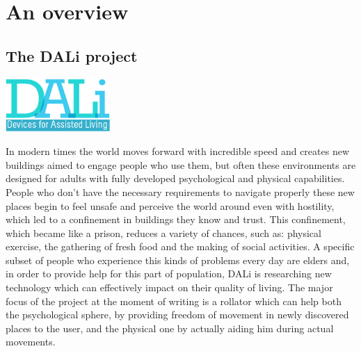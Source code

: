 \chapter{An overview}

\vspace{0.5cm}
\section{The DALi project}

\vspace{1cm}
\begin{center}
      \includegraphics[width=0.3\textwidth]{img/Dali-logo.png}
\end{center}
\vspace{1cm}

In modern times the world moves forward with incredible speed and creates new buildings aimed to engage people who use them, but often these environments are designed for adults with fully developed psychological and physical capabilities.
People who don't have the necessary requirements to navigate properly these new places begin to feel unsafe and perceive the world around even with hostility, which led to a confinement in buildings they know and trust.
This confinement, which became like a prison, reduces a variety of chances, such as: physical exercise, the gathering of fresh food and the making of social activities.
\newline
A specific subset of people who experience this kinds of problems every day are elders and, in order to provide help for this part of population, DALi is researching new technology which can effectively impact on their quality of living.
\newline
The major focus of the project at the moment of writing is a rollator which can help both the psychological sphere, by providing freedom of movement in newly discovered places to the user, and the physical one by actually aiding him during actual movements.

\newpage
